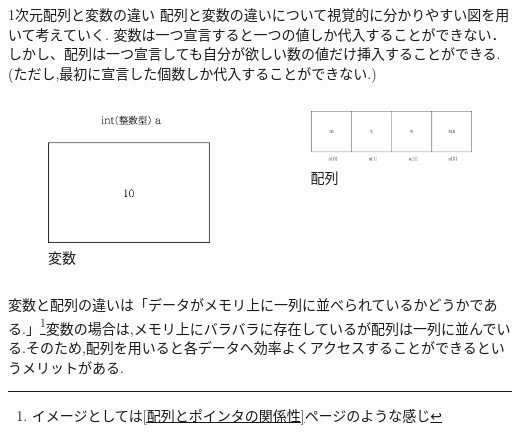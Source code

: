 \begin{frame}[allowframebreaks]{1次元配列と変数の違い}
    配列と変数の違いについて視覚的に分かりやすい図を用いて考えていく.
    変数は一つ宣言すると一つの値しか代入することができない．
    しかし、配列は一つ宣言しても自分が欲しい数の値だけ挿入することができる.(ただし,最初に宣言した個数しか代入することができない.)


    \begin{columns}[b]
        \begin{column}{0.48 \linewidth}
            \begin{figure}[b]
                \includegraphics[width=0.6\columnwidth]{png/var.png}
                \caption{変数}
            \end{figure}
        \end{column}
        \begin{column}{0.48 \linewidth}
            \begin{figure}[b]
                \includegraphics[width=0.6\columnwidth]{png/arr.png}
                \caption{配列}
            \end{figure}
        \end{column}
    \end{columns}
    \newpage

    変数と配列の違いは「データがメモリ上に一列に並べられているかどうかである.」\footnote{イメージとしては\ref{配列とポインタの関係性}ページのような感じ}変数の場合は,メモリ上にバラバラに存在しているが配列は一列に並んでいる.そのため,配列を用いると各データへ効率よくアクセスすることができるというメリットがある.
\end{frame}

